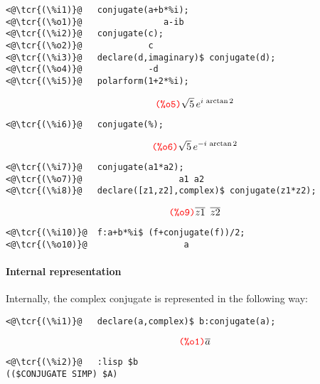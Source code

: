 \documentclass[../Maxima_Workbook.tex]{subfiles}
\begin{document}
\begin{small}
\color{blue} \leqn
\vspace{2mm}\begin{lstlisting}
<@\tcr{(\%i1)}@   conjugate(a+b*%i);
<@\tcr{(\%o1)}@			       a-ib
<@\tcr{(\%i2)}@   conjugate(c);
<@\tcr{(\%o2)}@			  	c
<@\tcr{(\%i3)}@   declare(d,imaginary)$ conjugate(d);
<@\tcr{(\%o4)}@			 	-d
<@\tcr{(\%i5)}@   polarform(1+2*%i);
\end{lstlisting}
\vspace{-5mm} \[ \tag*{\tcr{\ttfamily (\%o5)}} \sqrt{5} \, e^{i \, \arctan 2} \]
\vspace{-9mm} \begin{lstlisting}
<@\tcr{(\%i6)}@   conjugate(%);
\end{lstlisting}
\vspace{-5mm} \[ \tag*{\tcr{\ttfamily (\%o6)}} \sqrt{5} \, e^{-i \, \arctan 2} \]
\vspace{-9mm} \begin{lstlisting}
<@\tcr{(\%i7)}@   conjugate(a1*a2);
<@\tcr{(\%o7)}@   			      a1 a2
<@\tcr{(\%i8)}@   declare([z1,z2],complex)$ conjugate(z1*z2);
\end{lstlisting}
\vspace{-5mm} \[\tag*{\tcr{\ttfamily (\%o9)}} \ov{z1} \en \ov{z2} \]
\vspace{-9mm} \begin{lstlisting}
<@\tcr{(\%i10)}@  f:a+b*%i$ (f+conjugate(f))/2;
<@\tcr{(\%o10)}@   			       a
\end{lstlisting}\vspace{-2mm} 
\color{black} \reqn
\end{small}

\paragraph{Internal representation} \mbox{}

\lz Internally, the complex conjugate is represented in the following way:

\begin{small}
\color{blue} \leqn
\vspace{2mm}\begin{lstlisting}
<@\tcr{(\%i1)}@   declare(a,complex)$ b:conjugate(a);
\end{lstlisting}
\vspace{-5mm} \[\tag*{\tcr{\ttfamily (\%o1)}} \ov{a} \]
\vspace{-10mm} \begin{lstlisting}
<@\tcr{(\%i2)}@   :lisp $b
(($CONJUGATE SIMP) $A)
\end{lstlisting}\vspace{-2mm} 
\color{black} \reqn
\end{small}
\end{document}
